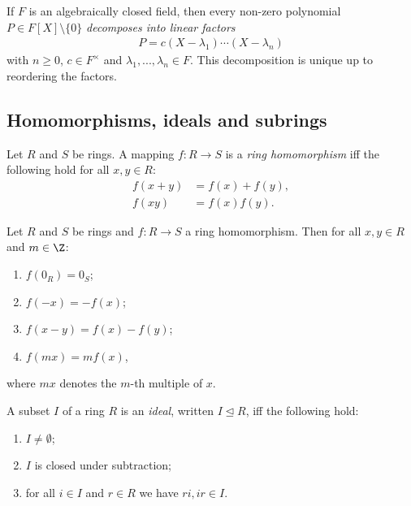 \documentclass{article}
\begin{document}
\begin{theorem}[Notes 3.3.14]
	If $F$ is an algebraically closed field, then every non-zero polynomial
	$P\in F[X]\setminus\{0\}$ \emph{decomposes into linear factors}
	\begin{align*}
		P=c(X-\lambda_1)\cdots(X-\lambda_n)
	\end{align*}
	with $n\geq 0$, $c\in F^\times$ and $\lambda_1,...,\lambda_n\in F$. This
	decomposition is unique up to reordering the factors.
\end{theorem}

\subsection{Homomorphisms, ideals and subrings}

\begin{definition}
	Let $R$ and $S$ be rings. A mapping $f:R\to S$ is a \emph{ring homomorphism} iff
	the following hold for all $x,y\in R$:
	\begin{align*}
		f(x+y) & = f(x) + f(y), \\
		f(xy)  & = f(x)f(y).
	\end{align*}
\end{definition}

\begin{lemma}[Notes 3.4.5]
	Let $R$ and $S$ be rings and $f:R\to S$ a ring homomorphism. Then for all $x,y\in R$
	and $m\in\Z$:
	\begin{enumerate}
		\item $f(0_R)=0_S$;
		\item $f(-x)=-f(x)$;
		\item $f(x-y)=f(x)-f(y)$;
		\item $f(mx)=mf(x)$,
	\end{enumerate}
	where $mx$ denotes the $m$-th multiple of $x$.
\end{lemma}

\begin{definition}
	A subset $I$ of a ring $R$ is an \emph{ideal}, written $I\trianglelefteq R$, iff
	the following hold:
	\begin{enumerate}
		\item $I\not=\emptyset$;
		\item $I$ is closed under subtraction;
		\item for all $i\in I$ and $r\in R$ we have $ri,ir\in I$.
	\end{enumerate}
\end{definition}
\end{document}
